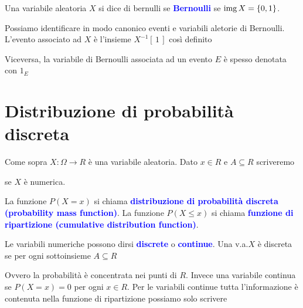 \documentclass[10pt,openany]{book}
\def\0{\varnothing}
\def\range{\mathop{\rm img}}
\def\emph#1{\textcolor{blue}{\textbf{\boldmath #1}}}
\theoremstyle{mio}
\theoremstyle{liscio}
\begin{document}
Una variabile aleatoria $X$ si dice di bernulli se \emph{Bernoulli\/} se $\range X=\{0,1\}$.

Possiamo identificare in modo canonico eventi e variabili aletorie di Bernoulli. L'evento associato ad $X$ è l'insieme $X^{-1}[\,1\,]$ così definito


Viceversa, la variabile di Bernoulli associata ad un evento $E$ è spesso denotata con $1_E$


\clearpage\section{Distribuzione di probabilità discreta}

Come sopra $X:\Omega\to R$ è una variabile aleatoria. Dato $x\in R$ e $A\subseteq R$ scriveremo

\ceq{\hfill \emph{$p_x$}\medrel{=}\emph{$P(X=x)$}}{=}{P\big(\{\omega\in\Omega\ :\ X(\omega)=x)\}\big)}

\ceq{\hfill \emph{$P(X\in A)$}}{=}{P\big(\{\omega\in\Omega\ :\ X(\omega)\in A)\}\big)}

\ceq{\hfill \emph{$P(X \le x$)}}{=}{P\big(\{\omega\in\Omega\ :\ X(\omega)\le x)\}\big)}\hfill  se $X$ \`e numerica.

La funzione $P(X=x)$ si chiama \emph{distribuzione di probabilità discreta (probability mass function)}. La funzione $P(X \le x)$ si chiama  \emph{funzione di ripartizione (cumulative distribution function)}.

Le variabili numeriche possono dirsi \emph{discrete\/} o \emph{continue}. Una v.a.\@ $X$ è discreta se per ogni sottoinsieme $A\subseteq R$


Ovvero la probabilità è concentrata nei punti di $R$. Invece una variabile continua se $P(X=x)=0$ per ogni $x\in R$. Per le variabili continue tutta l'informazione è contenuta nella funzione di ripartizione possiamo solo scrivere


\end{document}
